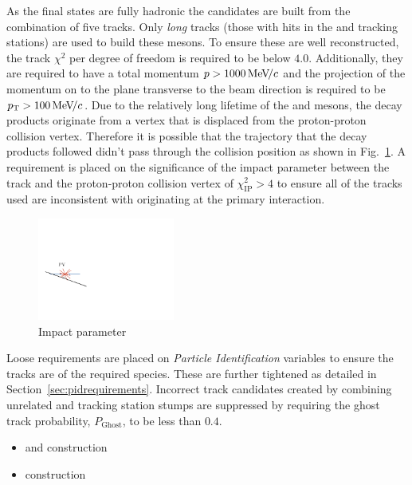 As the final states are fully hadronic the candidates are built from the combination of five tracks. Only \emph{long} tracks (those with hits in the \velo and tracking stations) are used to build these mesons. To ensure these are well reconstructed, the track $\chi^{2}$ per degree of freedom is required to be below $4.0$. Additionally, they are required to have a total momentum $\mbox{$p$} > 1000 {\mathrm{\,Me\kern -0.1em V\!/}c}$ and the projection of the momentum on to the plane transverse to the beam direction is required to be $\mbox{$p_{\mathrm{ T}}$} > 100 {\mathrm{\,Me\kern -0.1em V\!/}c}$.
Due to the relatively long lifetime of the \Bp and \D mesons, the decay products originate from a vertex that is displaced from the proton-proton collision vertex. Therefore it is possible that the trajectory that the decay products followed didn't pass through the collision position as shown in Fig.~\ref{fig:impact_parameter}. A requirement is placed on the significance of the impact parameter between the track and the proton-proton collision vertex of $\chi^{2}_{\text{IP}} > 4$ to ensure all of the tracks used are inconsistent with originating at the primary interaction.  
\begin{figure}[!h]
    \centering
    \includegraphics[width=0.4\textwidth]{figs/Selection/Impact_parameter.pdf}
    \caption{Impact parameter}
    \label{fig:impact_parameter}   
\end{figure}

Loose requirements are placed on \emph{Particle Identification} variables to ensure the tracks are of the required species. These are further tightened as detailed in Section~\ref{sec:pidrequirements}. Incorrect track candidates created by combining unrelated \velo and tracking station stumps are suppressed by requiring the ghost track probability, $P_{\text{Ghost}}$, to be less than $0.4$. 



{\color{Red}
\begin{itemize}
\item \Dsp and \phiz construction 
\item \Bp construction
\end{itemize}
}




